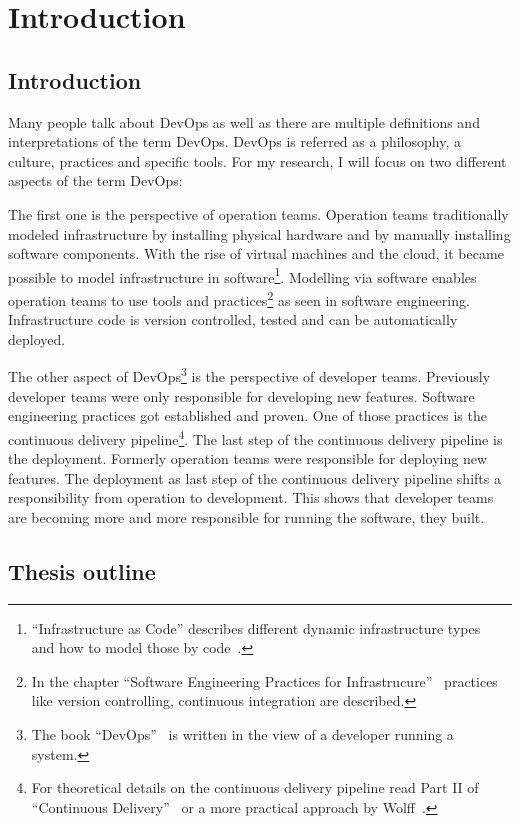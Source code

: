 \chapter{Introduction}
\section{Introduction}

Many people talk about DevOps as well as there are multiple definitions and
interpretations of the term DevOps. DevOps is referred as a philosophy, a culture,
practices and specific tools. For my research, I will focus on two different aspects of
the term DevOps:

The first one is the perspective of operation teams. Operation teams traditionally modeled
infrastructure by installing physical hardware and by manually installing software
components. With the rise of virtual machines and the cloud, it became possible to model
infrastructure in software\footnote{``Infrastructure as Code'' describes different dynamic
  infrastructure types~\cite[p. 30]{infra_as_code} and how to model those by
  code~\cite[p. 42]{infra_as_code}.}. Modelling via software enables operation teams to
use tools and practices\footnote{In the chapter ``Software Engineering Practices for
  Infrastrucure''~\cite[p. 179-194]{infra_as_code} practices like version controlling,
  continuous integration are described.} as seen in software engineering. Infrastructure
code is version controlled, tested and can be automatically deployed.

The other aspect of DevOps\footnote{The book ``DevOps''~\cite{devops} is written in the
  view of a developer running a system.} is the perspective of developer teams. Previously
developer teams were only responsible for developing new features. Software engineering
practices got established and proven. One of those practices is the continuous delivery
pipeline\footnote{For theoretical details on the continuous delivery pipeline read Part II
  of ``Continuous Delivery''~\cite[p. 103-140]{continuous_delivery} or a more practical
  approach by Wolff~\cite{continuous_delivery2}.}. The last step of the continuous
delivery pipeline is the deployment. Formerly operation teams were responsible for
deploying new features. The deployment as last step of the continuous delivery pipeline
shifts a responsibility from operation to development. This shows that developer teams are
becoming more and more responsible for running the software, they built.

\section{Thesis outline}


